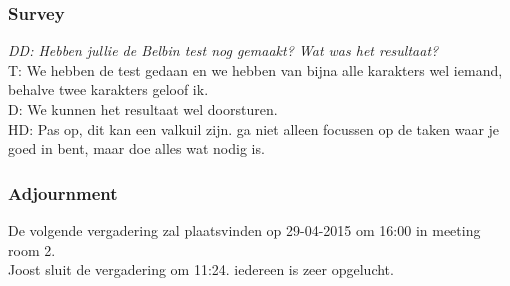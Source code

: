 \subsubsection{Survey}
\textit{DD: Hebben jullie de Belbin test nog gemaakt? Wat was het resultaat?}\\
T: We hebben de test gedaan en we hebben van bijna alle karakters wel iemand, behalve twee karakters geloof ik.\\
D: We kunnen het resultaat wel doorsturen.\\
HD: Pas op, dit kan een valkuil zijn. ga niet alleen focussen op de taken waar je goed in bent, maar doe alles wat nodig is.\\

\subsubsection{Adjournment}
De volgende vergadering zal plaatsvinden op 29-04-2015 om 16:00 in meeting room 2.\\

Joost sluit de vergadering om 11:24. iedereen is zeer opgelucht.\\
